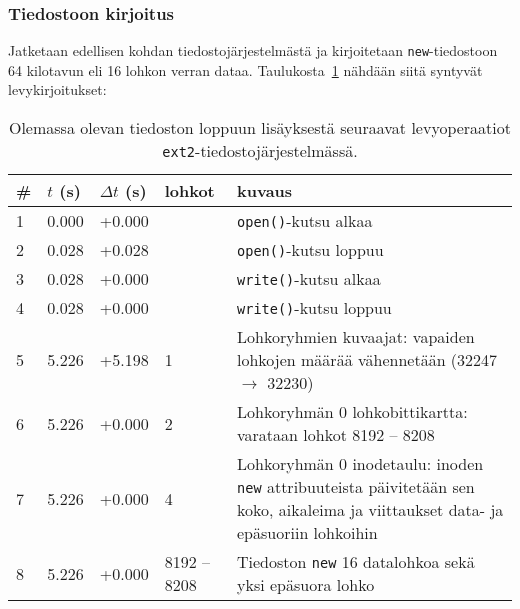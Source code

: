 \subsubsection{Tiedostoon kirjoitus}
\label{ChapExt2FileWrite}
Jatketaan edellisen kohdan tiedostojärjestelmästä ja kirjoitetaan \texttt{new}-tiedostoon 64 kilotavun eli 16 lohkon verran dataa.
Taulukosta~\ref{TabExt2Append} nähdään siitä syntyvät levykirjoitukset:
\begin{table}[H]
\centering
\begin{tabular}{l | l | l | l | p{7cm}}
    \# & $t$ (s) & $\Delta t$ (s) & lohkot & kuvaus \\ \hline \hline
    1  & 0.000    & +0.000   &            & \texttt{open()}-kutsu alkaa    \\ \hline %
    2  & 0.028    & +0.028   &            & \texttt{open()}-kutsu loppuu   \\ \hline %
    3  & 0.028    & +0.000   &            & \texttt{write()}-kutsu alkaa   \\ \hline %
    4  & 0.028    & +0.000   &            & \texttt{write()}-kutsu loppuu  \\ \hline %
    5  & 5.226    & +5.198   & 1          & Lohkoryhmien kuvaajat: vapaiden lohkojen määrää vähennetään (32247 $\rightarrow$ 32230)                             \\ \hline %
    6  & 5.226    & +0.000   & 2          & Lohkoryhmän 0 lohkobittikartta: varataan lohkot 8192 -- 8208         \\ \hline %
    7  & 5.226    & +0.000   & 4          & Lohkoryhmän 0 inodetaulu: inoden \texttt{new} attribuuteista päivitetään sen koko, aikaleima ja viittaukset data- ja epäsuoriin lohkoihin               \\ \hline %
    8  & 5.226    & +0.000   & 8192 -- 8208 & Tiedoston \texttt{new} 16 datalohkoa sekä yksi epäsuora lohko                            \\        %
\end{tabular}
\caption{Olemassa olevan tiedoston loppuun lisäyksestä seuraavat levyoperaatiot \texttt{ext2}-tiedostojärjestelmässä.}
\label{TabExt2Append}
\end{table}

